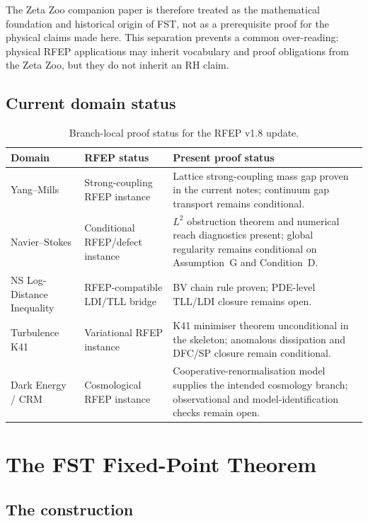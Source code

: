 \documentclass[11pt,a4paper]{article}
\theoremstyle{plain}
\theoremstyle{definition}
\begin{document}
The Zeta Zoo companion paper \cite{ZetaZooMaster} is therefore
treated as the mathematical foundation and historical origin of FST,
not as a prerequisite proof for the physical claims made here.  This
separation prevents a common over-reading: physical RFEP applications
may inherit vocabulary and proof obligations from the Zeta Zoo, but
they do not inherit an RH claim.

\subsection{Current domain status}

\begin{table}[h]
\centering
\begin{tabular}{p{} p{} p{}}
\toprule
Domain & RFEP status & Present proof status \\
\midrule
Yang--Mills & Strong-coupling RFEP instance &
Lattice strong-coupling mass gap proven in the current notes;
continuum gap transport remains conditional. \\
Navier--Stokes & Conditional RFEP/defect instance &
$L^2$ obstruction theorem and numerical reach diagnostics present;
global regularity remains conditional on Assumption~G and
Condition~D. \\
NS Log-Distance Inequality & RFEP-compatible LDI/TLL bridge &
BV chain rule proven; PDE-level TLL/LDI closure remains open. \\
Turbulence K41 & Variational RFEP instance &
K41 minimiser theorem unconditional in the skeleton; anomalous
dissipation and DFC/SP closure remain conditional. \\
Dark Energy / CRM & Cosmological RFEP instance &
Cooperative-renormalisation model supplies the intended cosmology
branch; observational and model-identification checks remain open. \\
\bottomrule
\end{tabular}
\caption{Branch-local proof status for the RFEP v1.8 update.}
\label{tab:domain-status}
\end{table}

\section{The FST Fixed-Point Theorem}
\label{sec:fixed-point}

\subsection{The construction}
\end{document}
